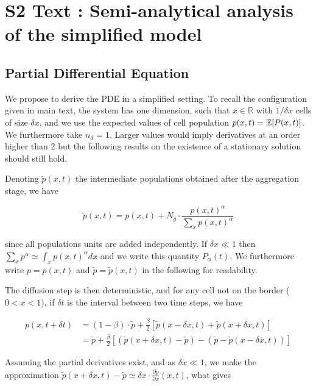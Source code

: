 



\section*{S2 Text : Semi-analytical analysis of the simplified model}


\subsection*{Partial Differential Equation}

We propose to derive the PDE in a simplified setting. To recall the configuration given in main text, the system has one dimension, such that $x\in \mathbb{R}$ with $1/\delta x$ cells of size $\delta x$, and we use the expected values of cell population $p(x,t) = \operatorname{\mathbb{E}}\!\left[P(x,t)\right]$. We furthermore take $n_d=1$. Larger values would imply derivatives at an order higher than 2 but the following results on the existence of a stationary solution should still hold. 

Denoting $\tilde{p}(x,t)$ the intermediate populations obtained after the aggregation stage, we have

\[
\tilde{p}(x,t) = p(x,t) + N_g\cdot \frac{p(x,t)^{\alpha}}{\sum_x p(x,t)^{\alpha}}
\]

since all populations units are added independently. If $\delta x \ll 1$ then $\sum_x p^{\alpha} \simeq \int_x p(x,t)^{\alpha}dx$ and we write this quantity $P_{\alpha}(t)$. We furthermore write $p=p(x,t)$ and $\tilde{p} = \tilde{p}(x,t)$ in the following for readability.

The diffusion step is then deterministic, and for any cell not on the border ($0<x<1$), if $\delta t$ is the interval between two time steps, we have

\[
\begin{split}
p(x,t+\delta t) & = (1 - \beta) \cdot \tilde{p} + \frac{\beta}{2} \left[\tilde{p}(x-\delta x,t) + \tilde{p}(x+\delta x,t)\right]\\
& = \tilde{p} + \frac{\beta}{2} \left[\left(\tilde{p}(x+\delta x,t) - \tilde{p}\right) - \left(\tilde{p} - \tilde{p}(x-\delta x,t)\right)\right]
\end{split}
\]

Assuming the partial derivatives exist, and as $\delta x \ll 1$, we make the approximation $\tilde{p}(x+\delta x,t) - \tilde{p} \simeq \delta x\cdot \frac{\partial \tilde{p}}{\partial{x}}(x,t)$, what gives 

